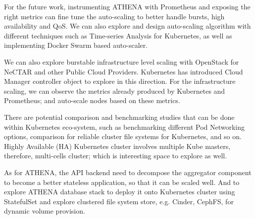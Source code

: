 For the future work, instrumenting ATHENA with Prometheus and exposing the right metrics can fine tune the auto-scaling to better handle bursts, high availability and QoS. We can also explore and design auto-scaling algorithm with different techniques such as Time-series Analysis for Kubernetes, as well as implementing Docker Swarm based auto-scaler.

We can also explore burstable infrastructure level scaling with OpenStack for NeCTAR and other Public Cloud Providers. Kubernetes has introduced Cloud Manager controller object to explore in this direction. For the infrastructure scaling, we can observe the metrics already produced by Kubernetes and Prometheus; and auto-scale nodes based on these metrics.

There are potential comparison and benchmarking studies that can be done within Kubernetes eco-system, such as benchmarking different Pod Networking options, comparison for reliable cluster file systems for Kubernetes, and so on. Highly Available (HA) Kubernetes cluster involves multiple Kube masters, therefore, multi-cells cluster; which is interesting space to explore as well.

As for ATHENA, the API backend need to decompose the aggregator component to become a better stateless application, so that it can be scaled well. And to explore ATHENA database stack to deploy it onto Kubernetes cluster using StatefulSet and explore clustered file system store, e.g. Cinder, CephFS, for dynamic volume provision.